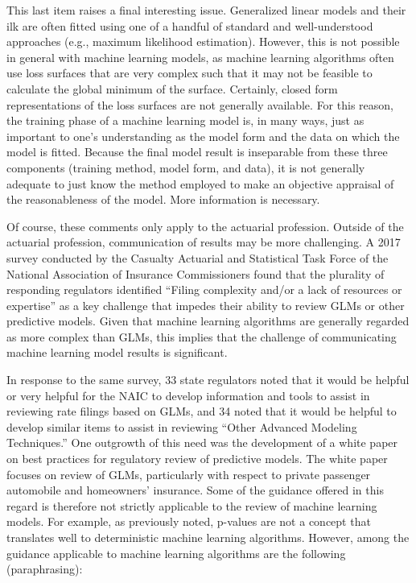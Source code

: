 \documentclass[]{interact}
\theoremstyle{plain}%
\theoremstyle{definition}
\theoremstyle{remark}
\begin{document}
This last item raises a final interesting issue. Generalized linear
models and their ilk are often fitted using one of a handful of standard
and well-understood approaches (e.g., maximum likelihood estimation).
However, this is not possible in general with machine learning models,
as machine learning algorithms often use loss surfaces that are very
complex such that it may not be feasible to calculate the global minimum
of the surface. Certainly, closed form representations of the loss
surfaces are not generally available. For this reason, the training
phase of a machine learning model is, in many ways, just as important to
one's understanding as the model form and the data on which the model is
fitted. Because the final model result is inseparable from these three
components (training method, model form, and data), it is not generally
adequate to just know the method employed to make an objective appraisal
of the reasonableness of the model. More information is necessary.

Of course, these comments only apply to the actuarial profession.
Outside of the actuarial profession, communication of results may be
more challenging. A 2017 survey conducted by the Casualty Actuarial and
Statistical Task Force of the National Association of Insurance
Commissioners found that the plurality of responding regulators
identified ``Filing complexity and/or a lack of resources or expertise''
as a key challenge that impedes their ability to review GLMs or other
predictive models. \citep{naic_summer_2017} Given that machine learning
algorithms are generally regarded as more complex than GLMs, this
implies that the challenge of communicating machine learning model
results is significant.

In response to the same survey, 33 state regulators noted that it would
be helpful or very helpful for the NAIC to develop information and tools
to assist in reviewing rate filings based on GLMs, and 34 noted that it
would be helpful to develop similar items to assist in reviewing ``Other
Advanced Modeling Techniques.'' One outgrowth of this need was the
development of a white paper on best practices for regulatory review of
predictive models. The white paper focuses on review of GLMs,
particularly with respect to private passenger automobile and
homeowners' insurance. Some of the guidance offered in this regard is
therefore not strictly applicable to the review of machine learning
models. For example, as previously noted, p-values are not a concept
that translates well to deterministic machine learning algorithms.
However, among the guidance applicable to machine learning algorithms
are the following (paraphrasing):
\end{document}
